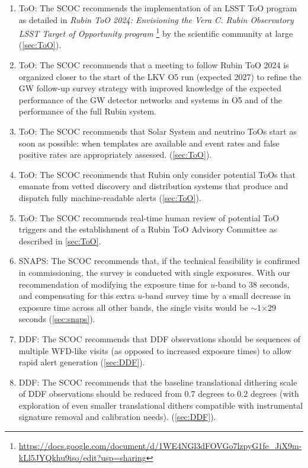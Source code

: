 \begin{enumerate}
\item  ToO: The SCOC recommends the implementation of an LSST ToO program as detailed in \emph{Rubin ToO 2024: 
Envisioning the Vera C. Rubin Observatory LSST Target of Opportunity program
}\footnote{\url{https://docs.google.com/document/d/1WE4NGl3dFOVGo7lzpyG1fe_JiX9m-kLl5JYQkhu9iso/edit?usp=sharing}} by the scientific community at large (\autoref{sec:ToO}).

\item  ToO: The SCOC recommends that a meeting to follow Rubin ToO 2024 is organized closer to the start of the LKV O5 run (expected 2027) to refine the GW follow-up survey strategy with improved knowledge of the expected performance of the GW detector networks and systems in O5 and of the performance of the full Rubin system. 

\item  ToO: The SCOC recommends that Solar System and neutrino ToOs start as soon as possible: when templates are available and event rates and false positive rates are appropriately assessed. (\autoref{sec:ToO}).

\item  ToO: The SCOC recommends that Rubin only consider potential ToOs that emanate from vetted discovery and distribution systems that produce and dispatch fully machine-readable alerts (\autoref{sec:ToO}).

\item  ToO: The SCOC recommends real-time human review of potential ToO triggers and the establishment of a Rubin ToO Advisory Committee as described in \autoref{sec:ToO}.

\item  SNAPS: The SCOC recommends that, if the technical feasibility is confirmed in commissioning, the survey is conducted with single exposures. With our recommendation of modifying the exposure time for $u$-band to 38 seconds, and compensating for this extra $u$-band survey time by a small decrease in exposure time across all other bands, the single visits would be \mbox{$\sim$1$\times$29} seconds (\autoref{sec:snaps}).

\item  DDF: The SCOC recommends that DDF observations should be sequences of multiple WFD-like visits (as opposed to increased exposure times) to allow rapid alert generation (\autoref{sec:DDF}).

\item  DDF: The SCOC recommends that the baseline translational dithering scale of DDF observations should be reduced from 0.7 degrees to 0.2 degrees (with exploration of even smaller translational dithers compatible with instrumental signature removal and calibration needs). (\autoref{sec:DDF}).


\end{enumerate}
